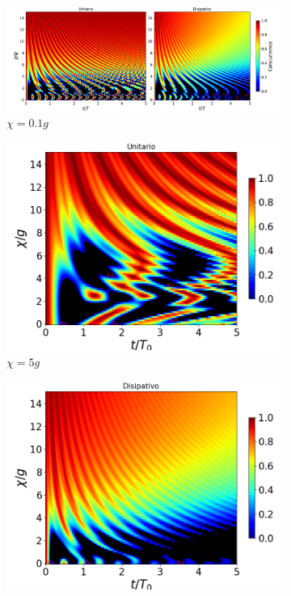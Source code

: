 \begin{figure}[h]
    \centering
    \begin{subfigure}{0.49\textwidth}
        \includegraphics[width=\textwidth]{figuras/ch4/concu/chi/eg1+ge1 d=1.0g k=0.0g J=0.0g gamma=0.1g concu chi.png}
        \caption{$\chi=0.1g$}
        \label{fig4:concu x 1 k1}
    \end{subfigure}
    \hfill
    \begin{subfigure}{0.49\textwidth}
        \includegraphics[width=\textwidth]{figuras/ch4/concu/chi/eg1+ge1 d=5.0g k=0.0g J=0.0g gamma=0.25g concu chi uni.png}
        \caption{$\chi=5g$}
        \label{fig4:concu x 1 k2}
    \end{subfigure}
    \vfill
    \begin{subfigure}{0.49\textwidth}
        \includegraphics[width=\textwidth]{figuras/ch4/concu/chi/eg1+ge1 d=0.0g k=0.5g J=0.0g gamma=0.25g concu chi dis.png}

\end{subfigure}
\end{figure}
